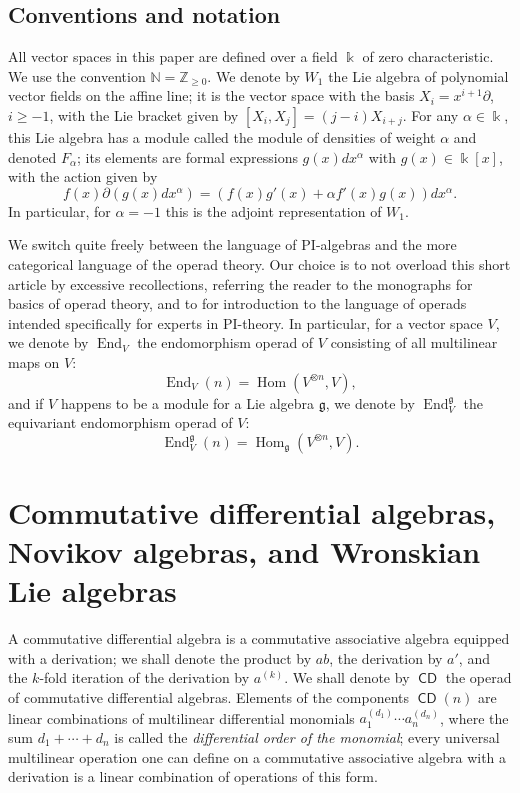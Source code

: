 \documentclass[11pt,reqno]{amsart}
\theoremstyle{plain}
\theoremstyle{definition}
\theoremstyle{remark}
\newcommand{\bk}{\Bbbk}
\DeclareMathOperator{\CDi}{\mathsf{CD}}
\DeclareMathOperator{\Hom}{Hom}
\DeclareMathOperator{\End}{End}
\begin{document}
\subsection*{Conventions and notation}

All vector spaces in this paper are defined over a field $\bk$ of zero characteristic. We use the convention $\mathbb{N}=\mathbb{Z}_{\ge 0}$.  We denote by $W_1$ the Lie algebra of polynomial vector fields on the affine line; it is the vector space with the basis $X_i=x^{i+1}\partial$, $i\ge -1$, with the Lie bracket given by $[X_i,X_j]=(j-i)X_{i+j}$. For any $\alpha\in\bk$, this Lie algebra has a module called the module of densities of weight $\alpha$ and denoted $F_\alpha$; its elements are formal expressions $g(x)dx^\alpha$ with $g(x)\in\bk[x]$, with the action given by
 \[
f(x)\partial(g(x)dx^\alpha)=\left(f(x)g'(x)+\alpha f'(x)g(x)\right) dx^\alpha.
 \]
In particular, for $\alpha=-1$ this is the adjoint representation of $W_1$. 

We switch quite freely between the language of PI-algebras and the more categorical language of the operad theory. Our choice is to not overload this short article by excessive recollections, referring the reader to the monographs \cite{MR3642294,MR2954392} for basics of operad theory, and to \cite[Sec.~2.3]{MR4675074} for introduction to the language of operads intended specifically for experts in PI-theory. In particular, for a vector space $V$, we denote by $\End_V$ the endomorphism operad of $V$ consisting of all multilinear maps on $V$:
 \[
\End_V(n)=\Hom(V^{\otimes n},V),     
 \]
and if $V$ happens to be a module for a Lie algebra $\mathfrak{g}$, we denote by $\End_V^{\mathfrak{g}}$ the equivariant endomorphism operad of $V$: 
 \[
\End_V^{\mathfrak{g}}(n)=\Hom_{\mathfrak{g}}(V^{\otimes n},V).     
 \]

\section{Commutative differential algebras, Novikov algebras, and Wronskian Lie algebras}\label{sec:CD-Nov-Wr}

A commutative differential algebra \cite{Kolchin,Ritt} is a commutative associative algebra equipped with a derivation; we shall denote the product by $ab$, the derivation by $a'$, and the $k$-fold iteration of the derivation by $a^{(k)}$. We shall denote by $\CDi$ the operad of commutative differential algebras. Elements of the components $\CDi(n)$ are linear combinations of multilinear differential monomials $a_1^{(d_1)}\cdots a_n^{(d_n)}$, where the sum $d_1+\cdots+d_n$ is called the \emph{differential order of the monomial}; every universal multilinear operation one can define on a commutative associative algebra with a derivation is a linear combination of operations of this form.
\end{document}
